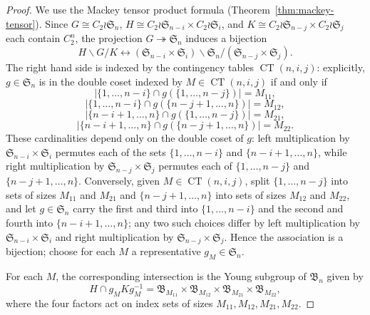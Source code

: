 \documentclass[12pt]{amsart}
\theoremstyle{plain}
\theoremstyle{definition}
\DeclareMathOperator{\CT}{CT}
\begin{document}
\begin{proof}
We use the Mackey tensor product formula (Theorem~\ref{thm:mackey-tensor}).
Since $G  \cong C_2 \wr \mathfrak{S}_n$, $H \cong C_2 \wr \mathfrak{S}_{n-i}\times C_2 \wr\mathfrak{S}_{i}$, and $K \cong C_2 \wr  \mathfrak{S}_{n-j} \times C_2 \wr \mathfrak{S}_{j}$ each contain $C_2^n$, the projection $G \twoheadrightarrow \mathfrak{S}_n$ induces a bijection
\begin{equation}
    H\backslash G /K \longleftrightarrow (\mathfrak{S}_{n-i} \times \mathfrak{S}_i) \backslash \mathfrak{S}_n / (\mathfrak{S}_{n-j} \times \mathfrak{S}_j).
\end{equation}
The right hand side is indexed by the contingency tables $\CT(n,i,j)$:
explicitly, $g \in \mathfrak{S}_n$ is in the double coset indexed by
$M \in \CT(n,i,j)$ if and only if
\begin{equation}
    \left|\{1,\ldots, n-i\} \cap g(\{1,\ldots,n-j\})\right| = M_{11},
\end{equation}
\begin{equation}
    \left|\{1,\ldots, n-i\} \cap g(\{n-j+1,\ldots,n\})\right| = M_{12},
\end{equation}
\begin{equation}
    \left|\{n-i+1,\ldots,n\} \cap g(\{1,\ldots, n-j\})\right| = M_{21},
\end{equation}
\begin{equation}
    \left|\{n-i+1,\ldots,n\} \cap g(\{n-j+1,\ldots,n\})\right| = M_{22}.
\end{equation}
These cardinalities depend only on the double coset of $g$: left multiplication by $\mathfrak{S}_{n-i} \times \mathfrak{S}_i$ permutes each of the sets $\{1,\ldots,n-i\}$ and $\{n-i+1,\ldots,n\}$, while right multiplication by $\mathfrak{S}_{n-j} \times \mathfrak{S}_j$ permutes each of $\{1,\ldots,n-j\}$ and $\{n-j+1,\ldots,n\}$.
Conversely, given $M \in \CT(n,i,j)$, split $\{1,\ldots,n-j\}$ into sets of sizes $M_{11}$ and $M_{21}$ and $\{n-j+1,\ldots,n\}$ into sets of sizes $M_{12}$ and $M_{22}$, and let $g \in \mathfrak{S}_n$ carry the first and third into $\{1,\ldots,n-i\}$ and the second and fourth into $\{n-i+1,\ldots,n\}$; any two such choices differ by left multiplication by $\mathfrak{S}_{n-i} \times \mathfrak{S}_i$ and right multiplication by $\mathfrak{S}_{n-j} \times \mathfrak{S}_j$.
Hence the association is a bijection; choose for each $M$ a representative $g_M \in \mathfrak{S}_n$.

For each $M$, the corresponding intersection is the Young subgroup of $\mathfrak{B}_n$ given by
\begin{equation}
    H \cap g_M K g_M^{-1} = \mathfrak{B}_{M_{11}} \times \mathfrak{B}_{M_{12}} \times \mathfrak{B}_{M_{21}} \times \mathfrak{B}_{M_{22}},
\end{equation}
where the four factors act on index sets of sizes $M_{11}, M_{12}, M_{21}, M_{22}$.


\end{proof}
\end{document}
